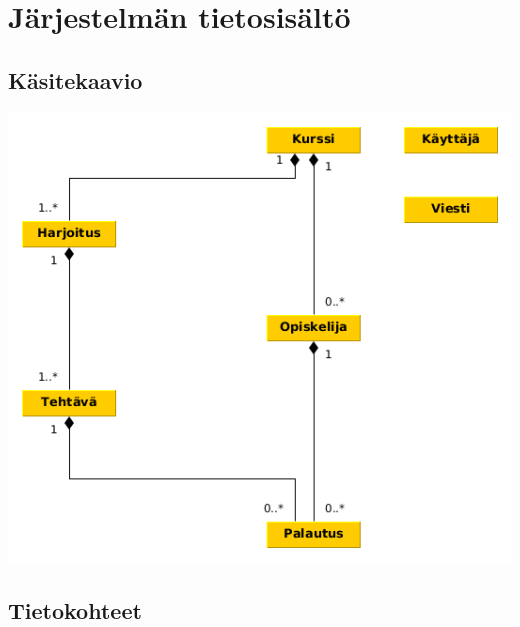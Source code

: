 \documentclass[a4paper,12pt, titlepage]{article}
\begin{document}
\section{Järjestelmän tietosisältö}

\subsection{Käsitekaavio}

\includegraphics[scale=0.5]{kasitekaavio}

\subsection{Tietokohteet}
\end{document}
